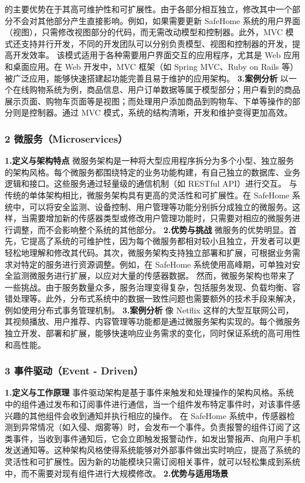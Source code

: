的主要优势在于其高可维护性和可扩展性。由于各部分相互独立，修改其中一个部分不会对其他部分产生直接影响。例如，如果需要更新 SafeHome 系统的用户界面（视图），只需修改视图部分的代码，而无需改动模型和控制器。此外，MVC 模式还支持并行开发，不同的开发团队可以分别负责模型、视图和控制器的开发，提高开发效率。 该模式适用于各种需要用户界面交互的应用程序，尤其是 Web 应用和桌面应用。在 Web 开发中，MVC 框架（如 Spring MVC、Ruby on Rails 等）被广泛应用，能够快速搭建起功能完善且易于维护的应用架构。 \textbf{3.案例分析} 以一个在线购物系统为例，商品信息、用户订单数据等属于模型部分；用户看到的商品展示页面、购物车页面等是视图；而处理用户添加商品到购物车、下单等操作的部分则是控制器。通过 MVC 模式，系统的结构清晰，开发和维护变得更加高效。 \subsubsection{2 微服务（Microservices）}\label{ux5faeux670dux52a1microservices} \textbf{1.定义与架构特点} 微服务架构是一种将大型应用程序拆分为多个小型、独立服务的架构风格。每个微服务都围绕特定的业务功能构建，有自己独立的数据库、业务逻辑和接口。这些服务通过轻量级的通信机制（如 RESTful API）进行交互。 与传统的单体架构相比，微服务架构具有更高的灵活性和可扩展性。在 SafeHome 系统中，可以将安全监测、设备控制、用户管理等功能分别拆分成独立的微服务。这样，当需要增加新的传感器类型或修改用户管理功能时，只需要对相应的微服务进行调整，而不会影响整个系统的其他部分。 \textbf{2.优势与挑战} 微服务的优势明显。首先，它提高了系统的可维护性，因为每个微服务都相对较小且独立，开发者可以更轻松地理解和修改其代码。其次，微服务架构支持独立部署和扩展，可根据业务需求对特定的服务进行资源调整。例如，在 SafeHome 系统使用高峰期，可单独对安全监测微服务进行扩展，以应对大量的传感器数据。 然而，微服务架构也带来了一些挑战。由于服务数量众多，服务治理变得复杂，包括服务发现、负载均衡、容错处理等。此外，分布式系统中的数据一致性问题也需要额外的技术手段来解决，例如使用分布式事务管理机制。 \textbf{3.案例分析} 像 Netflix 这样的大型互联网公司，其视频播放、用户推荐、内容管理等功能都是通过微服务架构实现的。每个微服务独立开发、部署和扩展，能够快速响应业务需求的变化，同时保证系统的高可用性和高性能。 \subsubsection{3 事件驱动（Event - Driven）}\label{ux4e8bux4ef6ux9a71ux52a8event---driven} \textbf{1.定义与工作原理} 事件驱动架构是基于事件来触发和处理操作的架构风格。系统中的组件通过发布和订阅事件进行通信，当一个组件发布特定事件时，对该事件感兴趣的其他组件会收到通知并执行相应的操作。 在 SafeHome 系统中，传感器检测到异常情况（如入侵、烟雾等）时，会发布一个事件。负责报警的组件订阅了这类事件，当收到事件通知后，它会立即触发报警动作，如发出警报声、向用户手机发送通知等。这种架构风格使得系统能够对外部事件做出实时响应，提高了系统的灵活性和可扩展性。因为新的功能模块只需订阅相关事件，就可以轻松集成到系统中，而不需要对现有组件进行大规模修改。 \textbf{2.优势与适用场景} 